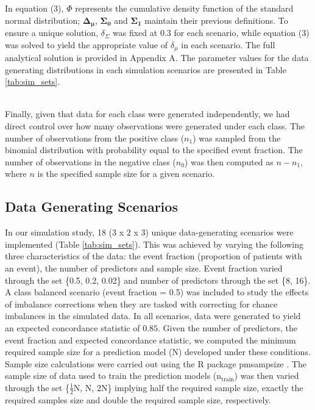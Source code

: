 \documentclass[AMA,STIX1COL,]{WileyNJD-v2}
\begin{document}
In equation (3), \(\Phi\) represents the cumulative density function of
the standard normal distribution; \(\pmb{\Delta_\mu}\),
\(\pmb{\Sigma_0}\) and \(\pmb{\Sigma_1}\) maintain their previous
definitions. To ensure a unique solution, \(\delta_\Sigma\) was fixed at
0.3 for each scenario, while equation (3) was solved to yield the
appropriate value of \(\delta_\mu\) in each scenario. The full
analytical solution is provided in Appendix A. The parameter values for
the data generating distributions in each simulation scenarios are
presented in Table \ref{tab:sim_sets}.\\
\strut \\
Finally, given that data for each class were generated independently, we
had direct control over how many observations were generated under each
class. The number of observations from the positive class (\(n_1\)) was
sampled from the binomial distribution with probability equal to the
specified event fraction. The number of observations in the negative
class (\(n_0\)) was then computed as \(n - n_1\), where \(n\) is the
specified sample size for a given scenario.

\hypertarget{data-generating-scenarios}{%
\subsection{Data Generating Scenarios}\label{data-generating-scenarios}}

\hfill\break
In our simulation study, 18 (\(3\) x \(2\) x \(3\)) unique
data-generating scenarios were implemented (Table \ref{tab:sim_sets}).
This was achieved by varying the following three characteristics of the
data: the event fraction (proportion of patients with an event), the
number of predictors and sample size. Event fraction varied through the
set \{0.5, 0.2, 0.02\} and number of predictors through the set \{8,
16\}. A class balanced scenario (event fraction = 0.5) was included to
study the effects of imbalance corrections when they are tasked with
correcting for chance imbalances in the simulated data. In all
scenarios, data were generated to yield an expected concordance
statistic of \(0.85\). Given the number of predictors, the event
fraction and expected concordance statistic, we computed the minimum
required sample size for a prediction model (N) developed under these
conditions. Sample size calculations were carried out using the R
package pmsampsize \citep{pmsampsize}. The sample size of data used to
train the prediction models (\(\mathrm{n}_{\mathrm{train}}\)) was then
varied through the set \{\(\frac{1}{2}\)N, N, \(2\)N\} implying half the
required sample size, exactly the required samples size and double the
required sample size, respectively.
\end{document}
